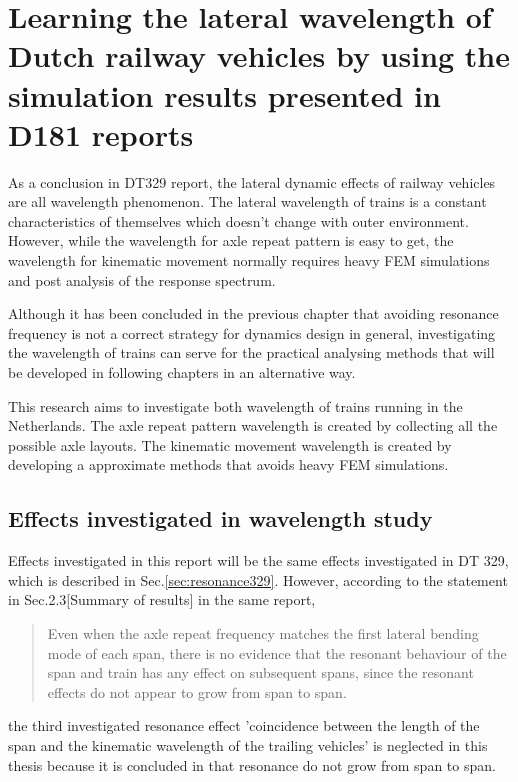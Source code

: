 

\chapter{Learning the lateral wavelength of Dutch railway vehicles by using the simulation results presented in D181 reports}\label{sec:wavelengthstudy}

As a conclusion in DT329 report, the lateral dynamic effects of railway vehicles are all wavelength phenomenon. The lateral wavelength of trains is a constant characteristics of themselves which doesn't change with outer environment. However, while the wavelength for axle repeat pattern is easy to get, the wavelength for kinematic movement normally requires heavy FEM simulations and post analysis of the response spectrum. 

Although it has been concluded in the previous chapter that avoiding resonance frequency is not a correct strategy for dynamics design in general, investigating the wavelength of trains can serve for the practical analysing methods that will be developed in following chapters in an alternative way.

This research aims to investigate both wavelength of trains running in the Netherlands. The axle repeat pattern wavelength is created by collecting all the possible axle layouts. The kinematic movement wavelength is created by developing a approximate methods that avoids heavy FEM simulations. 


\section{Effects investigated in wavelength study}

Effects investigated in this report will be the same effects investigated in DT 329, which is described in Sec.\ref{sec:resonance329}. However, according to the statement in Sec.2.3[Summary of results] in the same report,

\begin{quote}
Even when the axle repeat frequency matches the first lateral bending mode of each span, there is no evidence that the resonant behaviour of the span and train has any effect on subsequent spans, since the resonant effects do not appear to grow from span to span.
\end{quote}

the third investigated resonance effect 'coincidence between the length of the span and the kinematic wavelength of the trailing vehicles' is neglected in this thesis because it is concluded in \citet{d181dt329} that resonance do not grow from span to span. 


